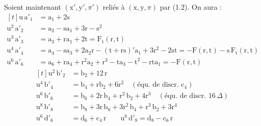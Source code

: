 Soient maintenant $(\mathrm{x}',\mathrm{y}',\pi')$ reliés à $(\mathrm{x},\mathrm{y},\pi)$ par (1.2). On aura :
\[
\begin{aligned}[t]
\mathrm{u}\,\mathrm{a}'_{1}&=\mathrm{a}_{1}+2\mathrm{s}\\
\mathrm{u}^{2}\,\mathrm{a}'_{2}&=\mathrm{a}_{2}-\mathrm{sa}_{1}+3\mathrm{r}-\mathrm{s}^{2}\\
\mathrm{u}^{3}\,\mathrm{a}'_{3}&=\mathrm{a}_{3}+\mathrm{ra}_{1}+2\mathrm{t}=\mathrm{F}_{\mathrm{t}}(\mathrm{r},\mathrm{t})\\
\mathrm{u}^{4}\,\mathrm{a}'_{4}&=\mathrm{a}_{4}-\mathrm{sa}_{3}+2\mathrm{a}_{2}\mathrm{r}-(\mathrm{t}+\mathrm{rs}){}'\mathrm{a}_{1}+3\mathrm{r}^{2}-2\mathrm{st}
=-\mathrm{F}(\mathrm{r},\mathrm{t})-\mathrm{s}\,\mathrm{F}_{\mathrm{t}}(\mathrm{r},\mathrm{t})\\
\mathrm{u}^{6}\,\mathrm{a}'_{6}&=\mathrm{a}_{6}+\mathrm{ra}_{4}+\mathrm{r}^{2}\mathrm{a}_{2}+\mathrm{r}^{3}-\mathrm{ta}_{3}-\mathrm{t}^{2}-\mathrm{rta}_{1}=-\mathrm{F}(\mathrm{r},\mathrm{t})
\end{aligned}
\tag*{(1.6)}
\]
\[
\begin{aligned}[t]
\mathrm{u}^{2}\,\mathrm{b}'_{2}&=\mathrm{b}_{2}+12\,\mathrm{r}\\
\mathrm{u}^{4}\,\mathrm{b}'_{4}&=\mathrm{b}_{4}+\mathrm{rb}_{2}+6\mathrm{r}^{2}\quad(\text{équ. de discr. }\mathrm{c}_{4})\\
\mathrm{u}^{6}\,\mathrm{b}'_{6}&=\mathrm{b}_{6}+2\mathrm{r}\,\mathrm{b}_{4}+\mathrm{r}^{2}\,\mathrm{b}_{2}+4\mathrm{r}^{3}\quad(\text{équ. de discr. }16\,\Delta)\\
\mathrm{u}^{8}\,\mathrm{b}'_{8}&=\mathrm{b}_{8}+3\mathrm{r}\,\mathrm{b}_{6}+3\mathrm{r}^{2}\,\mathrm{b}_{4}+\mathrm{r}^{3}\,\mathrm{b}_{2}+3\mathrm{r}^{4}\\
\mathrm{u}^{6}\,\mathrm{d}'_{6}&=\mathrm{d}_{6}+\mathrm{c}_{4}\,\mathrm{r}\qquad\mathrm{u}^{8}\,\mathrm{d}'_{8}=\mathrm{d}_{8}-\mathrm{c}_{6}\,\mathrm{r}
\end{aligned}
\tag*{(1.7)}
\]
\endgroup

